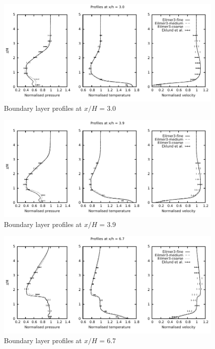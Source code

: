 %
\begin{figure}[h]
 \begin{center}
  \includegraphics[width=13.8cm]{./chap4-backward-facing-step/figs/xh_30.pdf}
 \end{center}
 \caption{Boundary layer profiles at $x/H$ = 3.0}
 \label{backward-facing-step-xH-30}
\end{figure}
%
\begin{figure}[h]
 \begin{center}
  \includegraphics[width=13.8cm]{./chap4-backward-facing-step/figs/xh_39.pdf}
 \end{center}
 \caption{Boundary layer profiles at $x/H$ = 3.9}
 \label{backward-facing-step-xH-39}
\end{figure}
%
\begin{figure}[h]
 \begin{center}
  \includegraphics[width=13.8cm]{./chap4-backward-facing-step/figs/xh_67.pdf}
 \end{center}
 \caption{Boundary layer profiles at $x/H$ = 6.7}
 \label{backward-facing-step-xH-67}
\end{figure}
